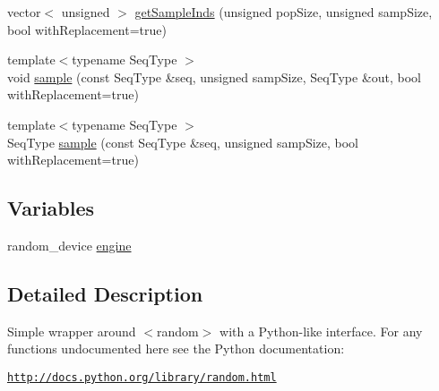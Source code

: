 \begin{DoxyCompactItemize}
vector$<$ unsigned $>$ \hyperlink{namespacekrandom_aa1ecb85e031f5505020d74732acd846a}{get\-Sample\-Inds} (unsigned pop\-Size, unsigned samp\-Size, bool with\-Replacement=true)
\item 
{\footnotesize template$<$typename Seq\-Type $>$ }\\void \hyperlink{namespacekrandom_a924f7dd5ed9785fd396615b9995e47da}{sample} (const Seq\-Type \&seq, unsigned samp\-Size, Seq\-Type \&out, bool with\-Replacement=true)
\item 
{\footnotesize template$<$typename Seq\-Type $>$ }\\Seq\-Type \hyperlink{namespacekrandom_a59cee8cdbf9ac39cc5d3762935dbdfb7}{sample} (const Seq\-Type \&seq, unsigned samp\-Size, bool with\-Replacement=true)
\end{DoxyCompactItemize}
\subsection*{Variables}
\begin{DoxyCompactItemize}
\item 
random\-\_\-device \hyperlink{namespacekrandom_a5c40b80390a0425475af691519056f21}{engine}
\end{DoxyCompactItemize}


\subsection{Detailed Description}
Simple wrapper around {\ttfamily $<$random$>$} with a Python-\/like interface. For any functions undocumented here see the Python documentation\-:

\href{http://docs.python.org/library/random.html}{\tt http\-://docs.\-python.\-org/library/random.\-html} 


